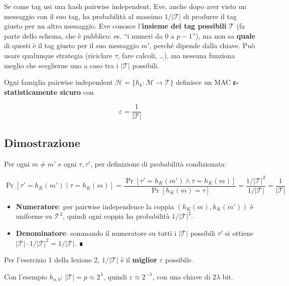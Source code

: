 \begin{inbreve}

Se come tag usi una hash pairwise independent, Eve, anche dopo aver visto un messaggio con il suo tag, ha probabilità al massimo \(1/|\mathcal{T}|\) di produrre il tag giusto per un altro messaggio.
Eve conosce l'\textbf{insieme dei tag possibili} \(\mathcal{T}\) (fa parte dello schema, che è pubblico: es. ``i numeri da 0 a \(p-1\)''), ma non sa \textbf{quale} di questi è il tag giusto per il suo messaggio \(m'\), perché dipende dalla chiave. Può usare qualunque strategia (riciclare \(\tau\), fare calcoli, \ldots), ma nessuna funziona meglio che sceglierne uno a caso tra i \(|\mathcal{T}|\) possibili.

\end{inbreve}

Ogni famiglia pairwise independent \(\mathcal{H} = \{h_k : \mathcal{M} \to \mathcal{T}\}\) definisce un MAC \textbf{ε-statisticamente sicuro} con

\[
\varepsilon = \frac{1}{|\mathcal{T}|}
\]

\subsection{Dimostrazione}

Per ogni \(m \ne m'\) e ogni \(\tau, \tau'\), per definizione di probabilità condizionata:

\[
\Pr[\tau' = h_K(m') \mid \tau = h_K(m)] = \frac{\Pr[\tau' = h_K(m') \wedge \tau = h_K(m)]}{\Pr[h_K(m) = \tau]} = \frac{1/|\mathcal{T}|^2}{1/|\mathcal{T}|} = \frac{1}{|\mathcal{T}|}
\]

\begin{itemize}
\tightlist
\item
  \textbf{Numeratore}: per pairwise independence la coppia \((h_K(m), h_K(m'))\) è uniforme su \(\mathcal{T}^2\), quindi ogni coppia ha probabilità \(1/|\mathcal{T}|^2\).
\item
  \textbf{Denominatore}: sommando il numeratore su tutti i \(|\mathcal{T}|\) possibili \(\tau'\) si ottiene \(|\mathcal{T}| \cdot 1/|\mathcal{T}|^2 = 1/|\mathcal{T}|\). ∎
\end{itemize}

Per l'esercizio 1 della lezione 2, \(1/|\mathcal{T}|\) è il \textbf{miglior} \(\varepsilon\) possibile.

\begin{nota}

Con l'esempio \(h_{a,b}\): \(|\mathcal{T}| = p \approx 2^\lambda\), quindi \(\varepsilon \approx 2^{-\lambda}\), con una chiave di \(2\lambda\) bit.

\end{nota}

